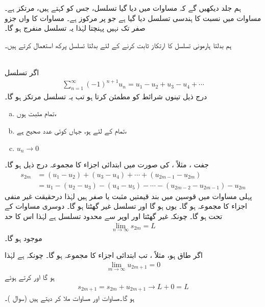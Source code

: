 ہم جلد دیکھیں گے کہ مساوات  میں دیا گیا تسلسل، جس کو  کہتے ہیں، مرتکز ہے۔ مساوات  میں  نسبت  کا ہندسی تسلسل دیا گیا ہے جو  پر مرکوز ہے۔ مساوات کا  واں جزو صفر تک نہیں پہنچتا لہٰذا یہ تسلسل منفرج ہو گا۔

ہم بدلتا ہارمونی تسلسل کا ارتکاز ثابت کرنے کے لئے بدلتا تسلسل پرکھ استعمال کرتے ہیں۔

\\
اگر تسلسل
\begin{align*}
\sum_{n=1}^{\infty}(-1)^{n+1}u_n=u_1-u_2+u_3-u_4+\cdots
\end{align*}
درج ذیل تینوں شرائط کو مطمئن کرتا ہو تب یہ تسلسل مرتکز ہو گا۔
\begin{enumerate}[a.]
\item
تمام مثبت ہوں،
\item
تمام  کے لئے  ہو، جہاں  کوئی عدد صحیح ہے،
\item
$u_n\to0$
\end{enumerate}
جفت ، مثلاً ، کی صورت میں ابتدائی  اجزاء کا مجموعہ درج ذیل ہو گا۔
\begin{align*}
s_{2m}&=(u_1-u_2)+(u_3-u_4)+\cdots+(u_{2m-1}-u_{2m})\\
&=u_1-(u_2-u_3)-(u_4-u_5)-\cdots-(u_{2m-2}-u_{2m-1})-u_{2m}
\end{align*}
پہلی مساوات میں قوسین میں بند قیمتیں مثبت یا صفر ہیں لہٰذا  درحقیقت  غیر منفی اجزاء کا مجموعہ ہو گا۔ یوں  ہو گا اور تسلسل  غیر گھٹتا ہو گا۔ دوسری مساوات کے تحت  ہو گا۔ چونکہ  غیر گھٹتا اور اوپر سے محدود تسلسل ہے لہٰذا اس کا حد 
\begin{align}\label{مساوات_تسلسل_بدلتا_حد_الف}
\lim_{n\to\infty}s_{2m}=L
\end{align}
موجود ہو گا۔

اگر  طاق ہو، مثلاً ، تب ابتدائی  اجزاء کا مجموعہ  ہو گا۔ چونکہ  ہے لہٰذا
\begin{align*}
\lim_{m\to\infty}u_{2m+1}=0
\end{align*}
ہو گا اور  کرتے ہوئے
\begin{align}\label{مساوات_تسلسل_بدلتا_حد_ب}
s_{2m+1}=s_{2m}+u_{2m+1}\to L+0=L
\end{align}
ہو گا۔مساوات  اور مساوات  ملا کر  دیتے ہیں (سوال )۔

